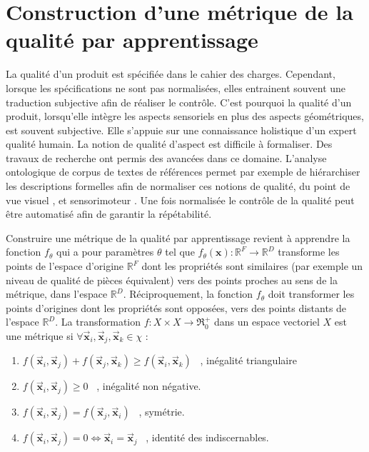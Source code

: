 \newpage
\section{Construction d'une métrique de la qualité par apprentissage} \label{sec:metric_learning}
La qualité d'un produit est spécifiée dans le cahier des charges.
Cependant, lorsque les spécifications ne sont pas normalisées, elles entrainent souvent une traduction subjective afin de réaliser le contrôle.
C'est pourquoi la qualité d'un produit, lorsqu'elle intègre les aspects sensoriels en plus des aspects géométriques, est souvent subjective.
Elle s'appuie sur une connaissance holistique d'un expert qualité humain. La notion de qualité d'aspect est difficile à formaliser.
Des travaux de recherche ont permis des avancées dans ce domaine.
L'analyse ontologique de corpus de textes de références permet par exemple de hiérarchiser les descriptions formelles afin de normaliser ces notions de qualité, du point de vue visuel \cite{baudet_maitrise_2012}, et sensorimoteur \cite{albert_smart_2017}.
Une fois normalisée le contrôle de la qualité peut être automatisé \cite{desage_contraintes_2015, pitard_metrologie_2016, lacombe_exploitation_2018a, albert_maitrise_2019} afin de garantir la répétabilité.

Construire une métrique de la qualité par apprentissage revient à apprendre la fonction $f_{\theta}$ qui a pour paramètres $\theta$ tel que $f_{\theta}(\mathbf{x}) : \mathbb{R}^{F} \rightarrow \mathbb{R}^{D}$ transforme les points de l'espace d'origine $\mathbb{R}^{F}$ dont les propriétés sont similaires (par exemple un niveau de qualité de pièces équivalent) vers des points proches au sens de la métrique, dans l'espace $\mathbb{R}^{D}$.
Réciproquement, la fonction $f_{\theta}$ doit transformer les points d'origines dont les propriétés sont opposées, vers des points distants de l'espace $\mathbb{R}^{D}$.
La transformation $f : X \times X \rightarrow \Re_{0}^{+} $ dans un espace vectoriel $X$ est une métrique si $\forall \vec{\mathbf{x}}_{i}, \vec{\mathbf{x}}_{j}, \vec{\mathbf{x}}_{k} \in \chi$ :

\begin{enumerate}
	\item $f\left(\vec{\mathbf{x}}_{i}, \vec{\mathbf{x}}_{j}\right) + f\left(\vec{\mathbf{x}}_{j}, \vec{\mathbf{x}}_{k}\right) \geq f\left(\vec{\mathbf{x}}_{i}, \vec{\mathbf{x}}_{k}\right)$ \ , inégalité triangulaire
	\item $f\left(\vec{\mathbf{x}}_{i}, \vec{\mathbf{x}}_{j}\right) \geq 0$ \ , inégalité non négative.
	\item $f\left(\vec{\mathbf{x}}_{i}, \vec{\mathbf{x}}_{j}\right)=f\left(\vec{\mathbf{x}}_{j}, \vec{\mathbf{x}}_{i}\right)$ \ , symétrie.
	\item $f\left(\vec{\mathbf{x}}_{i}, \vec{\mathbf{x}}_{j}\right)=0 \Longleftrightarrow \vec{\mathbf{x}}_{i}=\vec{\mathbf{x}}_{j}$ \ , identité des indiscernables.
\end{enumerate}

